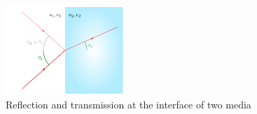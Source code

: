\documentclass[../class_mech_main.tex]{subfiles}
\begin{document}
\begin{figure}
    \centering

    \includegraphics[width=0.4\textwidth]{pictures/snell_law.pdf}

    \caption{Reflection and transmission at the interface of two media}
    \label{fig:snell_law}
\end{figure}
\end{document}
